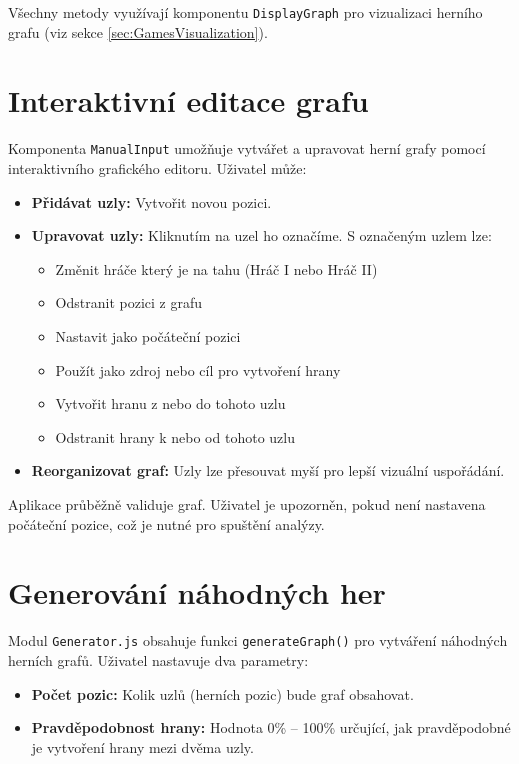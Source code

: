 Všechny metody využívají komponentu \texttt{DisplayGraph} pro vizualizaci herního grafu (viz sekce \ref{sec:GamesVisualization}).  

\section{Interaktivní editace grafu}
\label{sec:GamesInteractive}

Komponenta \texttt{ManualInput} umožňuje vytvářet a upravovat herní grafy pomocí interaktivního grafického editoru. Uživatel může:

\begin{itemize}
    \item \textbf{Přidávat uzly:} Vytvořit novou pozici.

    \item \textbf{Upravovat uzly:} Kliknutím na uzel ho označíme. S označeným uzlem lze:
    \begin{itemize}
        \item Změnit hráče který je na tahu (Hráč I nebo Hráč II)
        \item Odstranit pozici z grafu
        \item Nastavit jako počáteční pozici
        \item Použít jako zdroj nebo cíl pro vytvoření hrany
        \item Vytvořit hranu z nebo do tohoto uzlu
        \item Odstranit hrany k nebo od tohoto uzlu
    \end{itemize}
            
    \item \textbf{Reorganizovat graf:} Uzly lze přesouvat myší pro lepší vizuální uspořádání.
\end{itemize}

Aplikace průběžně validuje graf. Uživatel je upozorněn, pokud není nastavena počáteční pozice, což je nutné pro spuštění analýzy.

\section{Generování náhodných her}
\label{sec:GamesGeneration}

Modul \texttt{Generator.js} obsahuje funkci \texttt{generateGraph()} pro vytváření náhodných herních grafů. Uživatel nastavuje dva parametry:

\begin{itemize}
    \item \textbf{Počet pozic:} Kolik uzlů (herních pozic) bude graf obsahovat.
    \item \textbf{Pravděpodobnost hrany:} Hodnota 0\% -- 100\% určující, jak pravděpodobné je vytvoření hrany mezi dvěma uzly.
\end{itemize}

